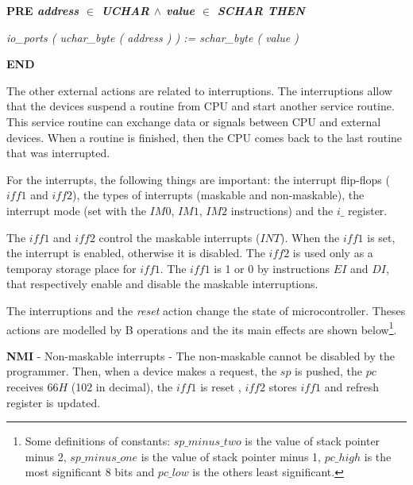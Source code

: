 \documentclass[11pt]{article} %
\begin{document}
\hspace*{0.20in}\bf PRE \it address  $\in$  \it UCHAR  $\land$ \hspace*{0.10in}\it value  $\in$  \it SCHAR \bf THEN

\hspace*{0.40in}\it io\_ports \rm ( \it uchar\_byte \rm ( \it address \rm ) \rm ) \rm := \it schar\_byte \rm ( \it
value \rm )

\hspace*{0.20in}\bf END\rm 

The other external actions are related to interruptions. The interruptions allow
that the devices suspend a routine from CPU and start another service routine.
This service routine can exchange data or signals between CPU and external
devices. When a routine is finished, then the CPU comes back to the last routine
that was interrupted.

For the interrupts, the following things are important:  the interrupt flip-flops
($\mathit{iff1}$ and $\mathit{iff2}$), the types of interrupts (maskable and
non-maskable), the interrupt mode (set with the $\mathit{IM 0}$, $\mathit{IM 1}$,
$\mathit{IM 2}$ instructions) and the $\mathit{i\_}$ register.

The $\mathit{iff1}$ and $\mathit{iff2}$ control the maskable interrupts
($\mathit{INT}$). When the $\mathit{iff1}$ is set, the interrupt is enabled,
otherwise it is disabled. The $\mathit{iff2}$ is used only as a temporay storage
place for $\mathit{iff1}$. The $\mathit{iff1}$ is 1 or 0 by instructions
$\mathit{EI}$ and $\mathit{DI}$, that respectively enable and disable the
maskable interruptions.


The interruptions and the \textit{reset} action change the state of
microcontroller. Theses actions are modelled by B operations and the its main
effects are shown below\footnote{Some definitions of constants: $\mathit{sp\_minus\_two}$ is the value of stack pointer minus 2,
 $\mathit{sp\_minus\_one}$ is the value of stack pointer minus 1,
$\mathit{pc\_high}$ is the most significant 8 bits and
$\mathit{pc\_low}$ is the others least significant.}.


 \textbf{NMI} - Non-maskable interrupts - The non-maskable cannot be disabled
 by the programmer. Then, when a device makes a request, the $sp$ is pushed, the
 $pc$ receives $66H$ (102 in decimal), the $\mathit{iff1}$ is reset , $\mathit{iff2}$ stores
 $\mathit{iff1}$ and refresh register is updated.
  
\end{document}
